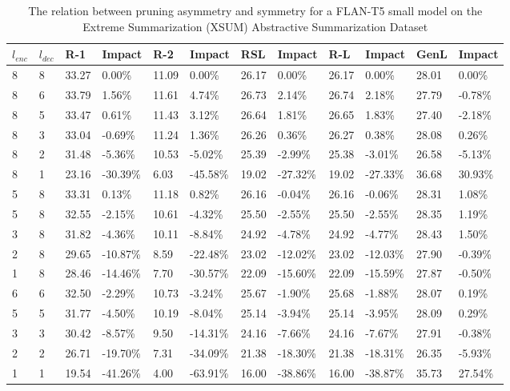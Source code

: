 \begin{table*}[!ht]
    \centering
    \caption{The relation between pruning asymmetry and symmetry for a FLAN-T5 small model on the Extreme Summarization (XSUM) Abstractive Summarization Dataset}
    \small
    \begin{tabular}{|l|l|l|l|l|l|l|l|l|l|l|l|}
    \hline
        $l_{enc}$ & $l_{dec}$ & R-1 & Impact & R-2 & Impact & RSL & Impact & R-L & Impact & GenL & Impact \\ \hline
        8 & 8 & 33.27 & 0.00\% & 11.09 & 0.00\% & 26.17 & 0.00\% & 26.17 & 0.00\% & 28.01 & 0.00\% \\ \hline
        8 & 6 & 33.79 & 1.56\% & 11.61 & 4.74\% & 26.73 & 2.14\% & 26.74 & 2.18\% & 27.79 & -0.78\% \\ \hline
        8 & 5 & 33.47 & 0.61\% & 11.43 & 3.12\% & 26.64 & 1.81\% & 26.65 & 1.83\% & 27.40 & -2.18\% \\ \hline
        8 & 3 & 33.04 & -0.69\% & 11.24 & 1.36\% & 26.26 & 0.36\% & 26.27 & 0.38\% & 28.08 & 0.26\% \\ \hline
        8 & 2 & 31.48 & -5.36\% & 10.53 & -5.02\% & 25.39 & -2.99\% & 25.38 & -3.01\% & 26.58 & -5.13\% \\ \hline
        8 & 1 & 23.16 & -30.39\% & 6.03 & -45.58\% & 19.02 & -27.32\% & 19.02 & -27.33\% & 36.68 & 30.93\% \\ \hline
        5 & 8 & 33.31 & 0.13\% & 11.18 & 0.82\% & 26.16 & -0.04\% & 26.16 & -0.06\% & 28.31 & 1.08\% \\ \hline
        5 & 8 & 32.55 & -2.15\% & 10.61 & -4.32\% & 25.50 & -2.55\% & 25.50 & -2.55\% & 28.35 & 1.19\% \\ \hline
        3 & 8 & 31.82 & -4.36\% & 10.11 & -8.84\% & 24.92 & -4.78\% & 24.92 & -4.77\% & 28.43 & 1.50\% \\ \hline
        2 & 8 & 29.65 & -10.87\% & 8.59 & -22.48\% & 23.02 & -12.02\% & 23.02 & -12.03\% & 27.90 & -0.39\% \\ \hline
        1 & 8 & 28.46 & -14.46\% & 7.70 & -30.57\% & 22.09 & -15.60\% & 22.09 & -15.59\% & 27.87 & -0.50\% \\ \hline
        6 & 6 & 32.50 & -2.29\% & 10.73 & -3.24\% & 25.67 & -1.90\% & 25.68 & -1.88\% & 28.07 & 0.19\% \\ \hline
        5 & 5 & 31.77 & -4.50\% & 10.19 & -8.04\% & 25.14 & -3.94\% & 25.14 & -3.95\% & 28.09 & 0.29\% \\ \hline
        3 & 3 & 30.42 & -8.57\% & 9.50 & -14.31\% & 24.16 & -7.66\% & 24.16 & -7.67\% & 27.91 & -0.38\% \\ \hline
        2 & 2 & 26.71 & -19.70\% & 7.31 & -34.09\% & 21.38 & -18.30\% & 21.38 & -18.31\% & 26.35 & -5.93\% \\ \hline
        1 & 1 & 19.54 & -41.26\% & 4.00 & -63.91\% & 16.00 & -38.86\% & 16.00 & -38.87\% & 35.73 & 27.54\% \\ \hline
    \end{tabular}
    \label{tab:asym-small-xsum}
\end{table*}

